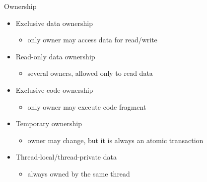 \begin{frame}{Ownership}

\begin{itemize}
    \item Exclusive data ownership
    \begin{itemize}
        \item only owner may access data for read/write        
    \end{itemize}

    \item Read-only data ownership
    \begin{itemize}
        \item several owners, allowed only to read data
    \end{itemize}

    \item Exclusive code ownership
    \begin{itemize}
        \item only owner may execute code fragment
    \end{itemize}

    \item Temporary ownership
    \begin{itemize}
        \item owner may change, but it is always an atomic transaction        
    \end{itemize}

    \item Thread-local/thread-private data
    \begin{itemize}
        \item always owned by the same thread
    \end{itemize}    
\end{itemize}
\end{frame}


